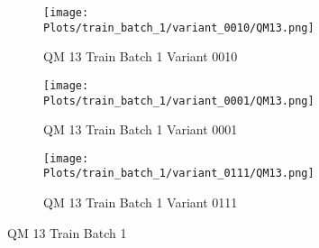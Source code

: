\documentclass{DissertateFigs}
\begin{document}
\begin{figure}[t!]
\medskip

    \begin{subfigure}{0.47\textwidth}
    \texttt{[image: Plots/train\_batch\_1/variant\_0010/QM13.png]}
    \caption{QM 13 Train Batch 1 Variant 0010}
    \end{subfigure}
    \begin{subfigure}{0.47\textwidth}
    \texttt{[image: Plots/train\_batch\_1/variant\_0001/QM13.png]}
    \caption{QM 13 Train Batch 1 Variant 0001}
    \end{subfigure}

\medskip

    \begin{subfigure}{0.47\textwidth}
    \texttt{[image: Plots/train\_batch\_1/variant\_0111/QM13.png]}
    \caption{QM 13 Train Batch 1 Variant 0111}
    \end{subfigure}
\caption{QM 13 Train Batch 1}
    \end{figure}
\clearpage
\end{document}
